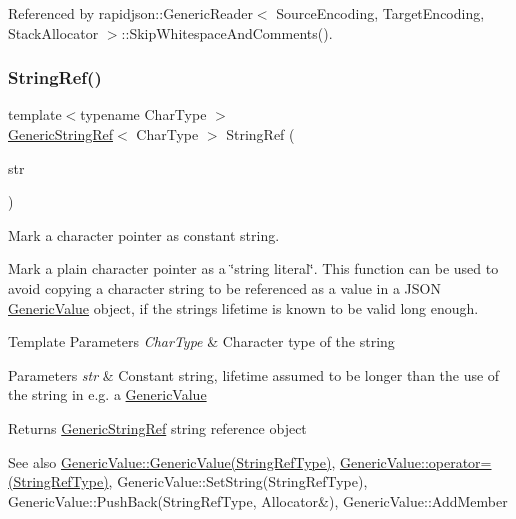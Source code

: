 Referenced by rapidjson\+::\+Generic\+Reader$<$ Source\+Encoding, Target\+Encoding, Stack\+Allocator $>$\+::\+Skip\+Whitespace\+And\+Comments().

\mbox{\label{namespacerapidjson_aa6b9fd9f6aa49405a574c362ba9af6b5}} 
\subsubsection{\texorpdfstring{StringRef()}{StringRef()}\hspace{0.1cm}{\footnotesize\ttfamily [1/2]}}
{\footnotesize\ttfamily template$<$typename Char\+Type $>$ \\
\mbox{\hyperlink{structrapidjson_1_1_generic_string_ref}{Generic\+String\+Ref}}$<$ Char\+Type $>$ String\+Ref (\begin{DoxyParamCaption}\item[{const Char\+Type $\ast$}]{str }\end{DoxyParamCaption})}



Mark a character pointer as constant string. 

Mark a plain character pointer as a \char`\"{}string literal\char`\"{}. This function can be used to avoid copying a character string to be referenced as a value in a J\+S\+ON \mbox{\hyperlink{classrapidjson_1_1_generic_value}{Generic\+Value}} object, if the string\textquotesingle{}s lifetime is known to be valid long enough. 
\begin{DoxyTemplParams}{Template Parameters}
{\em Char\+Type} & Character type of the string \\
\hline
\end{DoxyTemplParams}

\begin{DoxyParams}{Parameters}
{\em str} & Constant string, lifetime assumed to be longer than the use of the string in e.\+g. a \mbox{\hyperlink{classrapidjson_1_1_generic_value}{Generic\+Value}} \\
\hline
\end{DoxyParams}
\begin{DoxyReturn}{Returns}
\mbox{\hyperlink{structrapidjson_1_1_generic_string_ref}{Generic\+String\+Ref}} string reference object
\end{DoxyReturn}
\begin{DoxySeeAlso}{See also}
\mbox{\hyperlink{classrapidjson_1_1_generic_value_a65bfc3073fa80ee5eba8e985abe2f941}{Generic\+Value\+::\+Generic\+Value(\+String\+Ref\+Type)}}, \mbox{\hyperlink{classrapidjson_1_1_generic_value_aecc9d0a6aafe31f4fdf9f6e75e5f089c}{Generic\+Value\+::operator=(\+String\+Ref\+Type)}}, Generic\+Value\+::\+Set\+String(\+String\+Ref\+Type), Generic\+Value\+::\+Push\+Back(\+String\+Ref\+Type, Allocator\&), Generic\+Value\+::\+Add\+Member 
\end{DoxySeeAlso}


